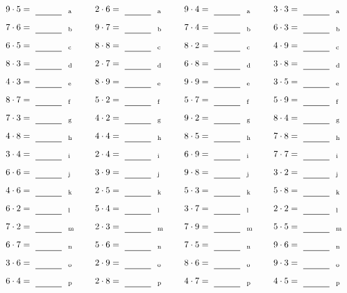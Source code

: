 \documentclass
[
  draft    = true,
  fontsize = 11pt,
  parskip  = half-
]
{scrartcl}
\begin{document}
\par\vfill\par
\begin{align*}
    \pline{9\cdot5}&=\rline{a}
  & \pline{2\cdot6}&=\rline{a}
  & \pline{9\cdot4}&=\rline{a}
  & \pline{3\cdot3}&=\rline{a} \\[1ex]
    \pline{7\cdot6}&=\rline{b}
  & \pline{9\cdot7}&=\rline{b}
  & \pline{7\cdot4}&=\rline{b}
  & \pline{6\cdot3}&=\rline{b} \\[1ex]
    \pline{6\cdot5}&=\rline{c}
  & \pline{8\cdot8}&=\rline{c}
  & \pline{8\cdot2}&=\rline{c}
  & \pline{4\cdot9}&=\rline{c} \\[1ex]
    \pline{8\cdot3}&=\rline{d}
  & \pline{2\cdot7}&=\rline{d}
  & \pline{6\cdot8}&=\rline{d}
  & \pline{3\cdot8}&=\rline{d} \\[1ex]
    \pline{4\cdot3}&=\rline{e}
  & \pline{8\cdot9}&=\rline{e}
  & \pline{9\cdot9}&=\rline{e}
  & \pline{3\cdot5}&=\rline{e} \\[1ex]
    \pline{8\cdot7}&=\rline{f}
  & \pline{5\cdot2}&=\rline{f}
  & \pline{5\cdot7}&=\rline{f}
  & \pline{5\cdot9}&=\rline{f} \\[1ex]
    \pline{7\cdot3}&=\rline{g}
  & \pline{4\cdot2}&=\rline{g}
  & \pline{9\cdot2}&=\rline{g}
  & \pline{8\cdot4}&=\rline{g} \\[1ex]
    \pline{4\cdot8}&=\rline{h}
  & \pline{4\cdot4}&=\rline{h}
  & \pline{8\cdot5}&=\rline{h}
  & \pline{7\cdot8}&=\rline{h} \\[1ex]
    \pline{3\cdot4}&=\rline{i}
  & \pline{2\cdot4}&=\rline{i}
  & \pline{6\cdot9}&=\rline{i}
  & \pline{7\cdot7}&=\rline{i} \\[1ex]
    \pline{6\cdot6}&=\rline{j}
  & \pline{3\cdot9}&=\rline{j}
  & \pline{9\cdot8}&=\rline{j}
  & \pline{3\cdot2}&=\rline{j} \\[1ex]
    \pline{4\cdot6}&=\rline{k}
  & \pline{2\cdot5}&=\rline{k}
  & \pline{5\cdot3}&=\rline{k}
  & \pline{5\cdot8}&=\rline{k} \\[1ex]
    \pline{6\cdot2}&=\rline{l}
  & \pline{5\cdot4}&=\rline{l}
  & \pline{3\cdot7}&=\rline{l}
  & \pline{2\cdot2}&=\rline{l} \\[1ex]
    \pline{7\cdot2}&=\rline{m}
  & \pline{2\cdot3}&=\rline{m}
  & \pline{7\cdot9}&=\rline{m}
  & \pline{5\cdot5}&=\rline{m} \\[1ex]
    \pline{6\cdot7}&=\rline{n}
  & \pline{5\cdot6}&=\rline{n}
  & \pline{7\cdot5}&=\rline{n}
  & \pline{9\cdot6}&=\rline{n} \\[1ex]
    \pline{3\cdot6}&=\rline{o}
  & \pline{2\cdot9}&=\rline{o}
  & \pline{8\cdot6}&=\rline{o}
  & \pline{9\cdot3}&=\rline{o} \\[1ex]
    \pline{6\cdot4}&=\rline{p}
  & \pline{2\cdot8}&=\rline{p}
  & \pline{4\cdot7}&=\rline{p}
  & \pline{4\cdot5}&=\rline{p}
\end{align*}
\end{document}
